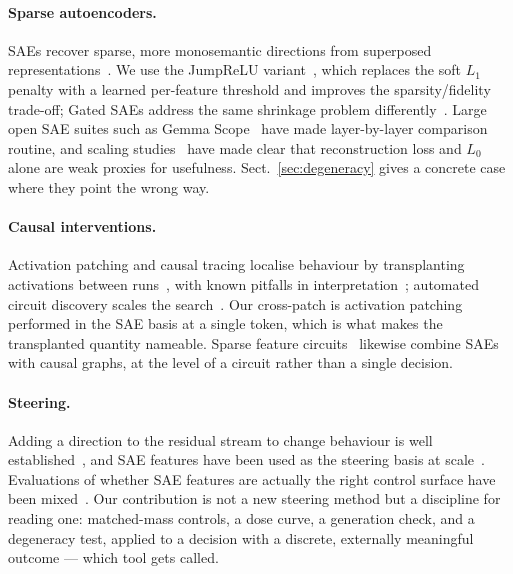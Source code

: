 \documentclass{article}
\begin{document}
\paragraph{Sparse autoencoders.} SAEs recover sparse, more monosemantic directions from superposed representations~\cite{elhage2022toymodelssuperposition,ref_bricken2023,cunningham2023sparseautoencodershighlyinterpretable}. We use the JumpReLU variant~\cite{ref_rajamanoharan2024}, which replaces the soft $L_1$ penalty with a learned per-feature threshold and improves the sparsity/fidelity trade-off; Gated SAEs address the same shrinkage problem differently~\cite{rajamanoharan2024improvingdictionarylearninggated}. Large open SAE suites such as Gemma Scope~\cite{lieberum2024gemmascopeopensparse} have made layer-by-layer comparison routine, and scaling studies~\cite{gao2024scalingevaluatingsparseautoencoders} have made clear that reconstruction loss and $L_0$ alone are weak proxies for usefulness. Sect.~\ref{sec:degeneracy} gives a concrete case where they point the wrong way.

\paragraph{Causal interventions.} Activation patching and causal tracing localise behaviour by transplanting activations between runs~\cite{meng2022locatingeditingfactualassociations,wang2022interpretabilitywildcircuitindirect}, with known pitfalls in interpretation~\cite{heimersheim2024useinterpretactivationpatching}; automated circuit discovery scales the search~\cite{conmy2023automatedcircuitdiscoverymechanistic}. Our cross-patch is activation patching performed in the SAE basis at a single token, which is what makes the transplanted quantity nameable. Sparse feature circuits~\cite{marks2024sparsefeaturecircuitsdiscovering} likewise combine SAEs with causal graphs, at the level of a circuit rather than a single decision.

\paragraph{Steering.} Adding a direction to the residual stream to change behaviour is well established~\cite{turner2024steeringlanguagemodelsactivation,zou2025representationengineeringtopdownapproach}, and SAE features have been used as the steering basis at scale~\cite{templeton2024scaling}. Evaluations of whether SAE features are actually the right control surface have been mixed~\cite{makelov2024principledevaluationssparseautoencoders}. Our contribution is not a new steering method but a discipline for reading one: matched-mass controls, a dose curve, a generation check, and a degeneracy test, applied to a decision with a discrete, externally meaningful outcome --- which tool gets called.
\end{document}

